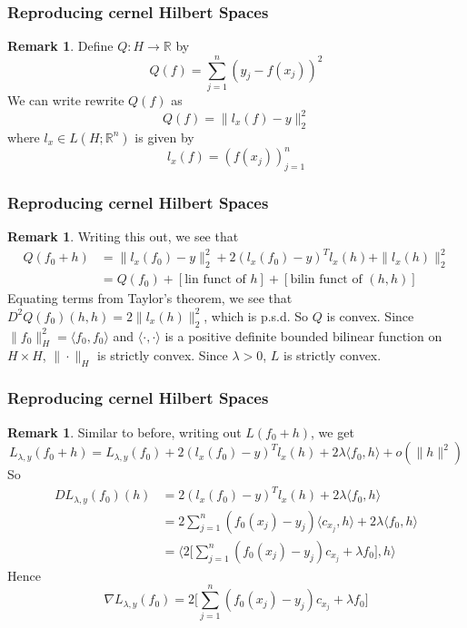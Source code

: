 \documentclass[notheorems]{beamer}
\theoremstyle{definition}
\newtheorem{rem}[definition]{Remark}
\newcommand{\lam}{\lambda}
\newcommand{\R}{\mathbb{R}}
\renewcommand{\r}{\rangle}
\renewcommand{\l}{\langle}
\begin{document}
\begin{frame}
\frametitle{Reproducing cernel Hilbert Spaces}
\begin{rem}
Define $Q: H \rightarrow \R$ by $$Q(f) = \sum_{j=1}^n (y_j - f(x_j) )^2$$ 
\pause
We can write rewrite $Q(f)$ as  $$Q(f) = \|l_x(f) - y\|_2^2$$ where $l_x \in L(H; \R^n)$ is given by $$l_x(f) = (f(x_j))_{j=1}^n$$ 
\end{rem}
\end{frame}












\begin{frame}
\frametitle{Reproducing cernel Hilbert Spaces}
\begin{rem}
Writing this out, we see that 
\begin{align*}
Q(f_0 + h) 
&= \|l_x(f_0) - y\|_2^2  + 2(l_x(f_0) - y)^T l_x(h) + \|l_x(h)\|_2^2 \\
&= Q(f_0) + [\text{lin funct of $h$}] +  [\text{bilin funct of $(h,h)$}]
\end{align*}
\pause
Equating terms from Taylor's theorem, we see that $D^2Q(f_0)(h,h) = 2\|l_x(h)\|_2^2$, which is p.s.d. So $Q$ is convex. Since $\|f_0\|^2_H = \l f_0, f_0\r$ and $\l \cdot, \cdot \r$ is a positive definite bounded bilinear function on $H \times H$, $\|\cdot\|_H$ is strictly convex. Since $\lam > 0$, $L$ is strictly convex. 
\end{rem}
\end{frame}














\begin{frame}
\frametitle{Reproducing cernel Hilbert Spaces}
\begin{rem}
Similar to before, writing out $L(f_0 + h)$, we get
$$L_{\lam, y}(f_0 + h) = L_{\lam, y}(f_0) + 2(l_x(f_0) - y)^T l_x(h) + 2 \lam \l f_0 , h\r + o(\|h\|^2) $$
\pause
So 
\begin{align*}
DL_{\lam, y}(f_0)(h) 
&= 2(l_x(f_0) - y)^T l_x(h) + 2 \lam \l f_0 , h\r \\
&= 2\sum_{j=1}^n (f_0(x_j)- y_j) \l c_{x_j}, h\r +  2 \lam \l f_0 , h\r \\
&= \bigg \l  2\bigg [ \sum_{j=1}^n (f_0(x_j)- y_j) c_{x_j} + \lam f_0\bigg ] , h \bigg \r 
\end{align*}
\pause
Hence $$\nabla L_{\lam, y}(f_0) = 2\bigg [ \sum_{j=1}^n (f_0(x_j)- y_j) c_{x_j} + \lam f_0\bigg ]$$
\end{rem}
\end{frame}
\end{document}
